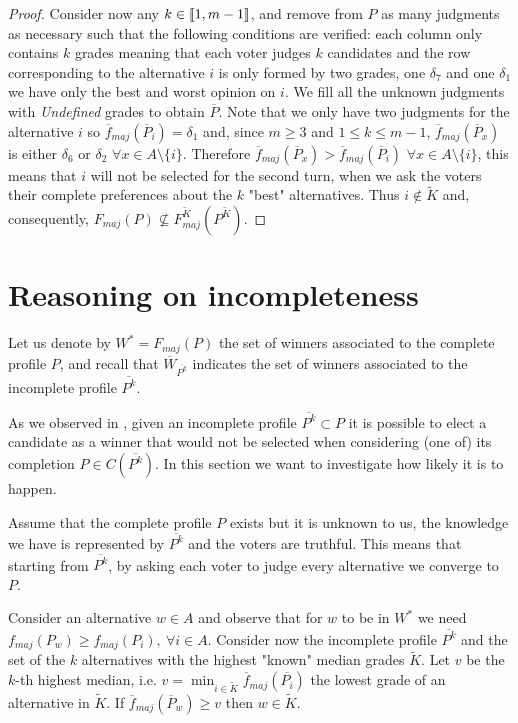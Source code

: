 \documentclass[version=3.21, pagesize, twoside=off, bibliography=totoc, DIV=calc, fontsize=12pt, a4paper]{scrartcl}
\begin{document}
\begin{proof}
	Consider now any $k \in \llbracket1,m-1\rrbracket$, and remove from $P$ as many judgments as necessary such that the following conditions are verified: each column only contains $k$ grades \textemdash meaning that each voter judges $k$ candidates \textemdash and the row corresponding to the alternative $i$ is only formed by two grades, one $\delta_7$ and one $\delta_1$ \textemdash we have only the best and worst opinion on $i$. We fill all the unknown judgments with \textit{Undefined} grades to obtain $\overline{P}$. Note that we only have two judgments for the alternative $i$ so $\overline{f}_{maj}(\overline{P}_i)=\delta_1$ and, since $m\geq3$ and $1 \leq k \leq m-1$, $\overline{f}_{maj}(\overline{P}_x)$ is either $\delta_6$ or $\delta_2$ $\forall x \in A \setminus \{i\}$. Therefore $\overline{f}_{maj}(\overline{P}_x) > \overline{f}_{maj}(\overline{P}_i)$ $\forall x \in A \setminus \{i\}$, this means that $i$ will not be selected for the second turn, when we ask the voters their complete preferences about the $k$ "best" alternatives. Thus $i \notin \tilde{K}$ and, consequently, $F_{maj}(P) \nsubseteq F^{\tilde{K}}_{maj}(P^{\tilde{K}})$.
\end{proof}


\section{Reasoning on incompleteness}
Let us denote by $W^*=F_{maj}(P)$ the set of winners associated to the complete profile $P$, and recall that $\overline{W}_{\overline{P^k}}$ indicates the set of winners associated to the incomplete profile $\overline{P^k}$.

As we observed in , given an incomplete profile $\overline{P^k} \subset P$ it is possible to elect a candidate as a winner that would not be selected when considering (one of) its completion $P \in C(\overline{P^k})$. In this section we want to investigate how likely it is to happen.

Assume that the complete profile $P$ exists but it is unknown to us, the knowledge we have is represented by $\overline{P^k}$ and the voters are truthful. 
This means that starting from $\overline{P^k}$, by asking each voter to judge every alternative we converge to $P$.

Consider an alternative $w\in A$ and observe that for $w$ to be in $W^*$ we need $f_{maj}(P_w)\geq f_{maj}(P_i), \ \forall i \in A$. 
Consider now the incomplete profile $\overline{P^k}$ and the set of the $k$ alternatives with the highest "known" median grades $\tilde{K}$. 
Let $v$ be the $k$-th highest median, i.e. $v=\min_{i\in \tilde{K}} \overline{f}_{maj}(\overline{P_i})$ the lowest grade of an alternative in $\tilde{K}$. If $\overline{f}_{maj}(\overline{P}_w) \geq v$ then $w \in \tilde{K}$. 
\end{document}

